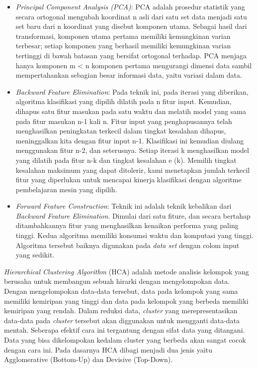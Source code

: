 \documentclass[a4paper,twoside]{article}
\begin{document}
\begin{enumerate}
\begin{itemize}
\item \textit{Principal Component Analysis (PCA)}: PCA adalah prosedur statistik yang secara ortogonal mengubah koordinat n asli dari satu set data menjadi satu set baru dari n koordinat yang disebut komponen utama. Sebagai hasil dari transformasi, komponen utama pertama memiliki kemungkinan varian terbesar; setiap komponen yang berhasil memiliki kemungkinan varian tertinggi di bawah batasan yang bersifat ortogonal terhadap. PCA menjaga hanya komponen m < n komponen pertama mengurangi dimensi data sambil mempertahankan sebagian besar informasi data, yaitu variasi dalam data.

\item \textit{Backward Feature Elimination}: Pada teknik ini, pada iterasi yang diberikan, algoritma klasifikasi yang dipilih dilatih pada n fitur input. Kemudian, dihapus satu fitur masukan pada satu waktu dan melatih model yang sama pada fitur masukan n-1 kali n. Fitur input yang penghapusannya telah menghasilkan peningkatan terkecil dalam tingkat kesalahan dihapus, meninggalkan kita dengan fitur input n-1. Klasifikasi ini kemudian diulang menggunakan fitur n-2, dan seterusnya. Setiap iterasi k menghasilkan model yang dilatih pada fitur n-k dan tingkat kesalahan e (k). Memilih tingkat kesalahan maksimum yang dapat ditolerir, kami menetapkan jumlah terkecil fitur yang diperlukan untuk mencapai kinerja klasifikasi dengan algoritme pembelajaran mesin yang dipilih.

\item \textit{Forward Feature Construction}: Teknik ini adalah teknik kebalikan dari \textit{Backward Feature Elimination}. Dimulai dari satu fiture, dan secara bertahap ditambahkannya fitur yang menghasilkan kenaikan performa yang paling tinggi. Kedua algoritma memiliki konsumsi waktu dan komputasi yang tinggi. Algoritma tersebut baiknya digunakan pada \textit{data set} dengan colom input yang sedikit.



\end{itemize}
		
\textit{Hierarchical Clustering Algorithm} (HCA) adalah metode analisis kelompok yang berusaha untuk membangun sebuah hirarki dengan mengelompokan data. Dengan mengelompokan data-data tersebut, data pada kelompok yang sama memiliki kemiripan yang tinggi dan data pada kelompok yang berbeda memiliki kemiripan yang rendah. Dalam reduksi data, \textit{cluster} yang merepresentasikan data-data pada \textit{cluster} tersebut akan diggunakan untuk mengganti data-data mentah. Seberapa efektif cara ini tergantung dengan sifat data yang ditangani. Data yang bisa dikelompokan kedalam cluster yang berbeda akan sangat cocok dengan cara ini. Pada dasarnya HCA dibagi menjadi dua jenis yaitu Agglomerative (Bottom-Up) dan Devisive (Top-Down).\\


\end{enumerate}
\end{document}
